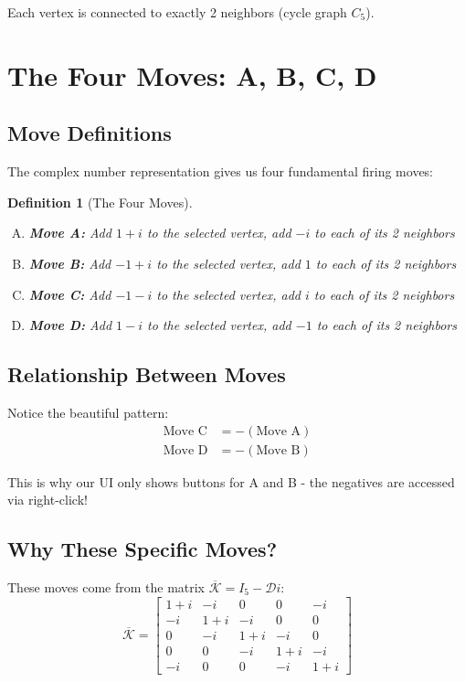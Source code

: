 \documentclass[11pt]{article}
\newtheorem{definition}{Definition}
\begin{document}
Each vertex is connected to exactly 2 neighbors (cycle graph $C_5$).

\section{The Four Moves: A, B, C, D}

\subsection{Move Definitions}

The complex number representation gives us four fundamental firing moves:

\begin{definition}[The Four Moves]
\begin{enumerate}[(A)]
    \item \textbf{Move A:} Add $1+i$ to the selected vertex, add $-i$ to each of its 2 neighbors
    \item \textbf{Move B:} Add $-1+i$ to the selected vertex, add $1$ to each of its 2 neighbors
    \item \textbf{Move C:} Add $-1-i$ to the selected vertex, add $i$ to each of its 2 neighbors
    \item \textbf{Move D:} Add $1-i$ to the selected vertex, add $-1$ to each of its 2 neighbors
\end{enumerate}
\end{definition}

\subsection{Relationship Between Moves}

Notice the beautiful pattern:
\begin{align*}
\text{Move C} &= -(\text{Move A}) \\
\text{Move D} &= -(\text{Move B})
\end{align*}

This is why our UI only shows buttons for A and B - the negatives are accessed via right-click!

\subsection{Why These Specific Moves?}

These moves come from the matrix $\overline{\mathcal{K}} = I_5 - \mathcal{D}i$:
\[
\overline{\mathcal{K}} = \begin{bmatrix}
    1 + i & -i & 0 & 0 & -i \\
    -i & 1 + i & -i & 0 & 0 \\
    0 & -i & 1 + i & -i & 0 \\
    0 & 0 & -i & 1 + i & -i \\
    -i & 0 & 0 & -i & 1 + i
\end{bmatrix}
\]
\end{document}
